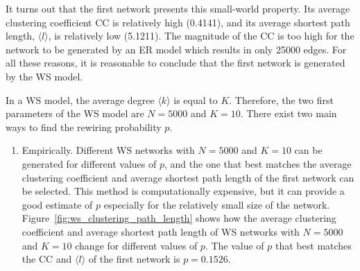\documentclass{article}
\begin{document}
It turns out that the first network presents this small-world property. Its average clustering coefficient $\text{CC}$ is relatively high (0.4141), and its average shortest path length, $\langle l\rangle$, is relatively low (5.1211). The magnitude of the $\text{CC}$ is too high for the network to be generated by an ER model which results in only 25000 edges. For all these reasons, it is reasonable to conclude that the first network is generated by the WS model.

In a WS model, the average degree $\langle k \rangle$ is equal to $K$. Therefore, the two first parameters of the WS model are $N=5000$ and $K=10$. There exist two main ways to find the rewiring probability $p$.
\begin{enumerate}
    \item Empirically. Different WS networks with $N = 5000$ and $K = 10$ can be generated for different values of $p$, and the one that best matches the average clustering coefficient and average shortest path length of the first network can be selected. This method is computationally expensive, but it can provide a good estimate of $p$ especially for the relatively small size of the network. Figure~\ref{fig:ws_clustering_path_length} shows how the average clustering coefficient and average shortest path length of WS networks with $N=5000$ and $K=10$ change for different values of $p$. The value of $p$ that best matches the $\text{CC}$ and $\langle l \rangle$ of the first network is $p = 0.1526$.
\end{enumerate}
\end{document}
